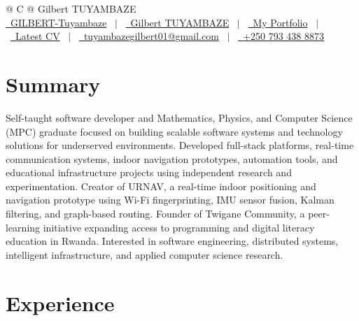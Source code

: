 \documentclass[a4paper,12pt]{article}
\begin{document}
\pagestyle{empty}

\begin{tabularx}{\linewidth}{@{} C @{}}
\Huge{Gilbert TUYAMBAZE} \\[7.5pt]

\href{https://github.com/GILBERT-Tuyambaze}{\raisebox{-0.05\height}\faGithub\ GILBERT-Tuyambaze}
\ $|$ \
\href{https://www.linkedin.com/in/gilbert-tuyambaze-02044a3bb/}{\raisebox{-0.05\height}\faLinkedin\ Gilbert TUYAMBAZE}
\ $|$ \
\href{https://tuyambaze-gilbert.vercel.app}{\raisebox{-0.05\height}\faGlobe\ My Portfolio}
\ $|$ \
\href{https://gilbert-tuyambaze.github.io/Gilbert-Tuyambaze-CV/cv.pdf}{\raisebox{-0.05\height}\faFile\ Latest CV}
\ $|$ \
\href{mailto:tuyambazegilbert01@gmail.com}{\raisebox{-0.05\height}\faEnvelope\ tuyambazegilbert01@gmail.com}
\ $|$ \
\href{tel:+250793438873}{\raisebox{-0.05\height}\faMobile\ +250 793 438 8873} \\
\end{tabularx}


\section{Summary}

Self-taught software developer and Mathematics, Physics, and Computer Science (MPC) graduate focused on building scalable software systems and technology solutions for underserved environments. Developed full-stack platforms, real-time communication systems, indoor navigation prototypes, automation tools, and educational infrastructure projects using independent research and experimentation. Creator of URNAV, a real-time indoor positioning and navigation prototype using Wi-Fi fingerprinting, IMU sensor fusion, Kalman filtering, and graph-based routing. Founder of Twigane Community, a peer-learning initiative expanding access to programming and digital literacy education in Rwanda. Interested in software engineering, distributed systems, intelligent infrastructure, and applied computer science research.


\section{Experience}
\end{document}
